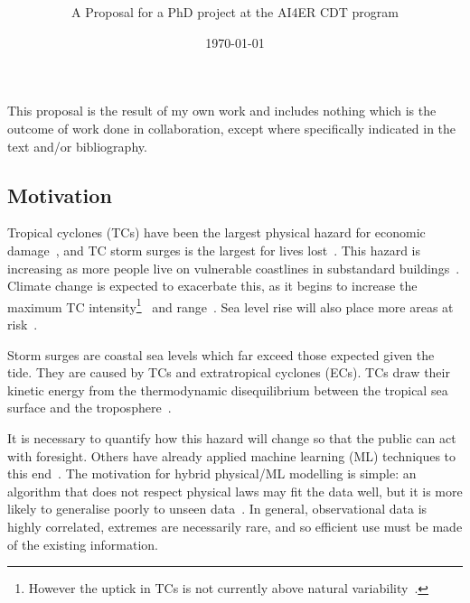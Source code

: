 \documentclass[usenames, dvipsnames]{article}      %
\title{\vspace*{-100pt}\textbf{\mytitle}\vspace{-15pt}}
\date{\vspace{-10pt}\today \vspace{-15pt}}
\author{A Proposal for a PhD project 
at the AI4ER CDT program  \\
\penname 
}
\begin{document}
\maketitle

\vspace{-10pt}\vspace{-5pt}

\footnotesize{
This proposal is the result of my own work and includes nothing which is the outcome of work done in collaboration, except where specifically indicated in the text and/or bibliography.}

\vspace{-10pt}

\normalsize

\subsection*{\vspace{-10pt}Motivation}


Tropical cyclones (TCs) have been the
largest physical hazard for economic 
damage~\cite{Chavas2013U.S.Perspective, shultz2005epidemiology},
and TC storm surges is the largest for lives
lost~\cite{shultz2005epidemiology, emanuel2005divine,
Rappaport2014FatalitiesInterpretation, zhang2009tropical}.
This hazard is increasing as more people live on vulnerable 
coastlines in substandard buildings~\cite{emanuel2005divine}.
Climate change is expected to exacerbate this,
as it begins to increase the maximum TC intensity\footnote{
However the uptick in TCs is not currently above
natural variability~\cite{mendelsohn2012impact}.}~\cite{
emanuel2008hurricanes,emanuel2017will, nordhaus2010} and
range~\cite{emanuel2008hurricanes, emanuel2017will, fedorov2010tropical}.
Sea level rise will also place 
more areas at risk~\cite{SROCC}.

Storm surges are coastal sea levels which
far exceed those expected given the tide.
They are caused by TCs and extratropical cyclones (ECs).
TCs draw their kinetic energy from the thermodynamic
disequilibrium between the tropical sea surface and the
troposphere~\cite{emanuel1986air, emanuel1987dependence}.

It is necessary to quantify how this hazard will
change so that the public can act with foresight.
Others have already applied machine learning (ML) techniques to
this end~\cite{kulp2019new, kulp2018coastaldem, tadesse2020data}.
The motivation for hybrid physical/ML modelling is simple:
an algorithm that does not respect physical laws may fit
the data well, but it is more likely to generalise
poorly to unseen data~\cite{beucler2019achieving}. 
In general, observational data is highly correlated, 
extremes are necessarily rare, and so efficient use
must be made of the existing information.\vspace{-5pt}
\end{document}
